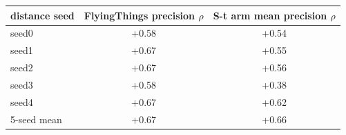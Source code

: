 \begin{tabular}{lcc}
\toprule
distance seed & FlyingThings precision $\rho$ & S-t arm mean precision $\rho$ \\
\midrule
seed0 & +0.58 & +0.54 \\
seed1 & +0.67 & +0.55 \\
seed2 & +0.67 & +0.56 \\
seed3 & +0.58 & +0.38 \\
seed4 & +0.67 & +0.62 \\
5-seed mean & +0.67 & +0.66 \\
\bottomrule
\end{tabular}
